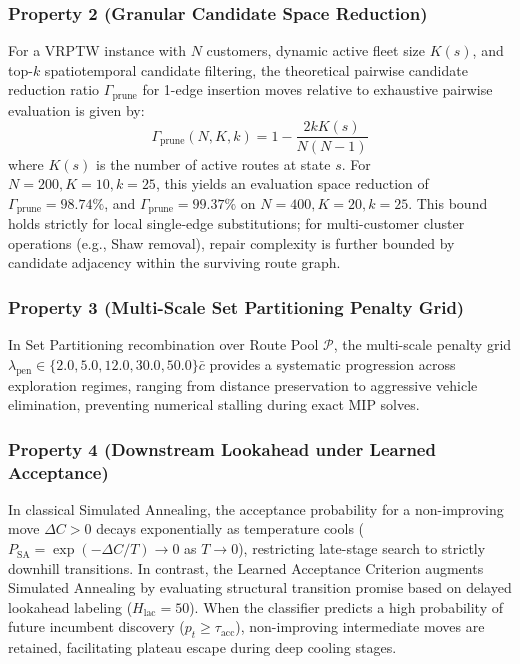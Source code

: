 \documentclass{ieeeaccess}
\begin{document}
\subsubsection{Property 2 (Granular Candidate Space Reduction)}
\label{prop:granular_pruning}
For a VRPTW instance with $N$ customers, dynamic active fleet size $K(s)$, and top-$k$ spatiotemporal candidate filtering, the theoretical pairwise candidate reduction ratio $\Gamma_{\text{prune}}$ for 1-edge insertion moves relative to exhaustive pairwise evaluation is given by:
\begin{equation}
  \Gamma_{\text{prune}}(N, K, k) = 1 - \frac{2 k K(s)}{N(N-1)}
  \label{eq:prop_pruning}
\end{equation}
where $K(s)$ is the number of active routes at state $s$. For $N=200, K=10, k=25$, this yields an evaluation space reduction of $\Gamma_{\text{prune}} = 98.74\%$, and $\Gamma_{\text{prune}} = 99.37\%$ on $N=400, K=20, k=25$. This bound holds strictly for local single-edge substitutions; for multi-customer cluster operations (e.g., Shaw removal), repair complexity is further bounded by candidate adjacency within the surviving route graph.

\subsubsection{Property 3 (Multi-Scale Set Partitioning Penalty Grid)}
\label{prop:penalty_floor}
In Set Partitioning recombination over Route Pool $\mathcal{P}$, the multi-scale penalty grid $\lambda_{\text{pen}} \in \{2.0, 5.0, 12.0, 30.0, 50.0\}\bar{c}$ provides a systematic progression across exploration regimes, ranging from distance preservation to aggressive vehicle elimination, preventing numerical stalling during exact MIP solves.

\subsubsection{Property 4 (Downstream Lookahead under Learned Acceptance)}
\label{prop:lac_behavior}
In classical Simulated Annealing, the acceptance probability for a non-improving move $\Delta C > 0$ decays exponentially as temperature cools ($P_{\text{SA}} = \exp(-\Delta C / T) \to 0$ as $T \to 0$), restricting late-stage search to strictly downhill transitions. In contrast, the Learned Acceptance Criterion augments Simulated Annealing by evaluating structural transition promise based on delayed lookahead labeling ($H_{\text{lac}} = 50$). When the classifier predicts a high probability of future incumbent discovery ($p_t \ge \tau_{\text{acc}}$), non-improving intermediate moves are retained, facilitating plateau escape during deep cooling stages.
\end{document}

